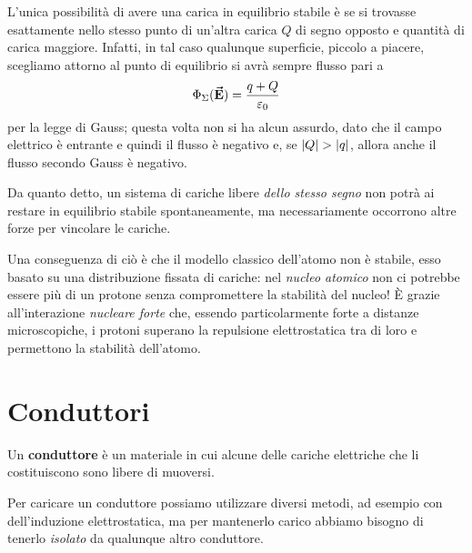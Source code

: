 L'unica possibilità di avere una carica in equilibrio stabile è se si trovasse esattamente nello stesso punto di un'altra carica $Q$ di segno opposto e quantità di carica maggiore. Infatti, in tal caso qualunque superficie, piccolo a piacere, scegliamo attorno al punto di equilibrio si avrà sempre flusso pari a
\begin{equation*}
	\Phi_{\Sigma}(\vb*{\va{E}})=\frac{q+Q}{\varepsilon_0}
\end{equation*}
per la legge di Gauss; questa volta non si ha alcun assurdo, dato che il campo elettrico è entrante e quindi il flusso è negativo e, se $\abs{Q}>\abs{q}$, allora anche il flusso secondo Gauss è negativo.
\begin{digression}
	Da quanto detto, un sistema di cariche libere \textit{dello stesso segno} non potrà ai restare in equilibrio stabile spontaneamente, ma necessariamente occorrono altre forze per vincolare le cariche.
	
	Una conseguenza di ciò è che il modello classico dell'atomo non è stabile, esso basato su una distribuzione fissata di cariche: nel \textit{nucleo atomico} non ci potrebbe essere più di un protone senza compromettere la stabilità del nucleo! È grazie all'interazione \textit{nucleare forte} che, essendo particolarmente forte a distanze microscopiche, i protoni superano la repulsione elettrostatica tra di loro e permettono la stabilità dell'atomo.
\end{digression}
\section{Conduttori}
\begin{define}[Conduttore]
	Un \textbf{conduttore} è un materiale in cui alcune delle cariche elettriche che li costituiscono sono libere di muoversi.
\end{define}
Per caricare un conduttore possiamo utilizzare diversi metodi, ad esempio con dell'induzione elettrostatica, ma per mantenerlo carico abbiamo bisogno di tenerlo \textit{isolato} da qualunque altro conduttore.

